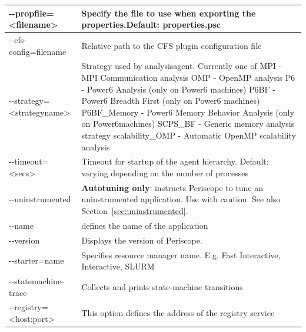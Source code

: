 \documentclass[11pt,oneside,a4paper]{book}
\begin{document}
\begin{center}
\begin{longtable}{|p{5cm}|p{7cm}|}
  -{}-propfile=\textless filename\textgreater &
  Specify the file to use when exporting the properties.\newline\newline Default: properties.psc \\
  \hline

  -{}-cfs-config=filename &
  Relative path to the CFS plugin configuration file \\
 \hline

  -{}-strategy=\textless strategyname\textgreater &
  Strategy used by analysisagent. Currently one of\newline
  MPI - MPI Communication analysis\newline
  OMP - OpenMP analysis\newline
  P6 - Power6 Analysis (only on Power6 machines)\newline
  P6BF - Power6 Breadth First (only on Power6 machines)\newline
  P6BF\_Memory - Power6 Memory Behavior Analysis (only on Power6machines)\newline
  SCPS\_BF - Generic memory analysis strategy\newline
  scalability\_OMP - Automatic OpenMP scalability analysis \\
  \hline

  -{}-timeout=\textless secs\textgreater &
  Timeout for startup of the agent hierarchy.\newline
  Default: varying depending on the number of processes \\
  \hline

  -{}-uninstrumented &
  \textbf{Autotuning only}: instructs Periscope to tune an uninstrumented
  application. Use with caution. See also Section~\ref{sec:uninstrumented}.\\
  \hline

  -{}-name &
  defines the name of the application\\
  \hline

  -{}-version &
  Displays the version of Periscope.\\
  \hline

  -{}-starter=name &
  Specifies resource manager name. E.g. Fast Interactive, Interactive, SLURM\\
  \hline

  -{}-statemachine-trace &
  Collects and prints state-machine transitions\\
  \hline

   -{}-registry=\textless host:port\textgreater &
   This option defines the address of the registry service\\
  \hline


\end{longtable}
\end{center}
\end{document}
